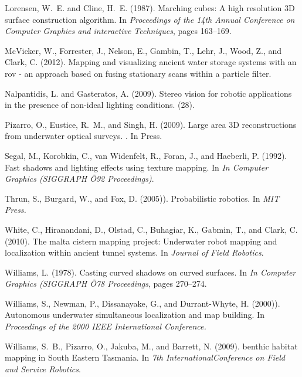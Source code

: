 \documentclass{llncs}
\begin{document}
\begin{thebibliography}{9}
Lorensen, W.~E. and Cline, H.~E. (1987).
\newblock Marching cubes: A high resolution {3D} surface construction
  algorithm.
\newblock In {\em Proceedings of the 14th Annual Conference on Computer
  Graphics and interactive Techniques}, pages 163--169.

McVicker, W., Forrester, J., Nelson, E., Gambin, T., Lehr, J., Wood, Z., and
  Clark, C. (2012).
\newblock Mapping and visualizing ancient water storage systems with an rov -
  an approach based on fusing stationary scans within a particle filter.

Nalpantidis, L. and Gasteratos, A. (2009).
\newblock Stereo vision for robotic applications in the presence of non-ideal
  lighting conditions.
\newblock (28).

Pizarro, O., Eustice, R.~M., and Singh, H. (2009).
\newblock Large area {3D} reconstructions from underwater optical surveys.
.
\newblock In Press.

Segal, M., Korobkin, C., van Widenfelt, R., Foran, J., and Haeberli, P. (1992).
\newblock Fast shadows and lighting effects using texture mapping.
\newblock In {\em In Computer Graphics (SIGGRAPH Õ92 Proceedings)}.

Thrun, S., Burgard, W., and Fox, D. (2005)).
\newblock Probabilistic robotics.
\newblock In {\em MIT Press.}

White, C., Hiranandani, D., Olstad, C., Buhagiar, K., Gabmin, T., and Clark, C.
  (2010).
\newblock The malta cistern mapping project: Underwater robot mapping and
  localization within ancient tunnel systems.
\newblock In {\em Journal of Field Robotics}.

Williams, L. (1978).
\newblock Casting curved shadows on curved surfaces.
\newblock In {\em In Computer Graphics (SIGGRAPH Õ78 Proceedings}, pages
  270--274.

Williams, S., Newman, P., Dissanayake, G., and Durrant-Whyte, H. (2000)).
\newblock Autonomous underwater simultaneous localization and map building.
\newblock In {\em Proceedings of the 2000 IEEE International Conference.}

Williams, S.~B., Pizarro, O., Jakuba, M., and Barrett, N. (2009).
 benthic habitat mapping in {S}outh {E}astern {T}asmania.
\newblock In {\em 7th InternationalConference on Field and Service Robotics}.


\end{thebibliography}
\end{document}
